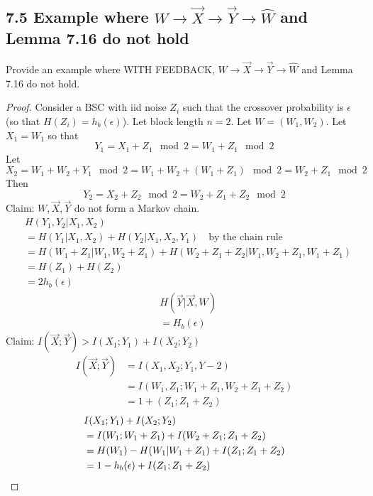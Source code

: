 \documentclass[../main.tex]{subfiles}
\begin{document}
\subsection*{7.5 Example where $W\to\vec X\to \vec Y\to \hat{W}$ and Lemma 7.16 do not hold}
Provide an example where WITH FEEDBACK, $W\to\vec X\to \vec Y\to \hat{W}$ and Lemma 7.16 do not hold.
\begin{proof}
   Consider a BSC with iid noise $Z_i$ such that the crossover probability is $\epsilon$ (so that $H(Z_i) = h_b(\epsilon)$). Let block length $n=2$. Let $W=(W_1,W_2)$. Let $X_1=W_1$ so that \[
   Y_1 = X_1 + Z_1\mod 2 = W_1 + Z_1 \mod 2
   \]
   Let \[
   X_2 = W_1 + W_2 + Y_1 \mod 2
   = W_1 + W_2 +(W_1+Z_1) \mod 2 = W_2 + Z_1 \mod 2
   \]
   Then \[
   Y_2 = X_2 + Z_2 \mod 2= W_2 + Z_1 + Z_2 \mod 2
   \]
   Claim: $W, \vec X, \vec Y$ do not form a Markov chain.
   \begin{align*}
       &H(Y_1, Y_2|X_1, X_2) \\
       &= H(Y_1|X_1,X_2) + H(Y_2|X_1,X_2,Y_1)\quad \text{by the chain rule}\\
       &= H(W_1+Z_1|W_1, W_2+Z_1) + H(W_2+Z_1+Z_2|W_1, W_2+Z_1, W_1+Z_1)\\
       &=H(Z_1) + H(Z_2)\\
       &= 2h_b(\epsilon)
   \end{align*}
   \begin{align*}
       &H(\vec Y|\vec X,W)\\
       &=H_b(\epsilon)
   \end{align*}
   Claim: $I(\vec X; \vec Y) > I(X_1;Y_1) + I(X_2; Y_2)$
   \begin{align*}
       I(\vec X; \vec Y) &= I(X_1,X_2;Y_1,Y-2)\\
       &=I(W_1,Z_1;W_1+Z_1, W_2+ Z_1+Z_2)\\
       &= 1 + (Z_1; Z_1+Z_2)
   \end{align*}
   \begin{align*}
       &I(X_1;Y_1) + I(X_2;Y_2)\\
       &= I(W_1; W_1+Z_1) + I(W_2+Z_1; Z_1+Z_2)\\
       &= H(W_1)-H(W_1|W_1+Z_1) + I(Z_1;Z_1+Z_2)\\
       &=1-h_b(\epsilon)+I(Z_1;Z_1+Z_2)   
   \end{align*}
\end{proof}
\end{document}
